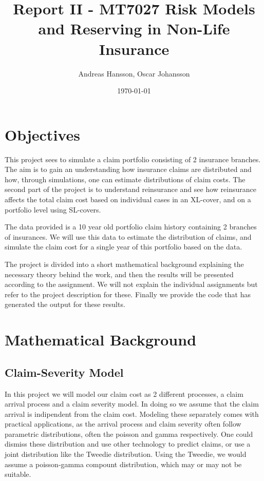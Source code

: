 \documentclass[11pt]{article}
\title{Report II - MT7027 Risk Models and Reserving in Non-Life Insurance}
\author{Andreas Hansson, Oscar Johansson}
\date{\today}
\begin{document}
\maketitle
\section*{Objectives}
This project sees to simulate a claim portfolio consisting of 2 insurance branches.
The aim is to gain an understanding how insurance claims are distributed and how, through simulations, one can estimate distributions of  claim costs.
The second part of the project is to understand reinsurance and see how reinsurance affects the total claim cost based on individual cases in an XL-cover, and on a portfolio level using SL-covers.

The data provided is a 10 year old portfolio claim history containing 2 branches of insurances.
We will use this data to estimate the distribution of claims, and simulate the claim cost for a single year of this portfolio based on the data.

The project is divided into a short mathematical background explaining the necessary theory behind the work, and then the results will be presented according to the assignment.
We will not explain the individual assignments but refer to the project description for these.
Finally we provide the code that has generated the output for these results.

\section*{Mathematical Background}

\subsection*{Claim-Severity Model}
In this project we will model our claim cost as 2 different processes, a claim arrival process and a claim severity model.
In doing so we assume that the claim arrival is indipendent from the claim cost.
Modeling these separately comes with practical applications, as the arrival process and claim severity often follow parametric distributions, often the poisson and gamma respectively.
One could dismiss these distribution and use other technology to predict claims, or use a joint distribution like the Tweedie distribution. 
Using the Tweedie, we would assume a poisson-gamma compount distribution, which may or may not be suitable.
\end{document}
